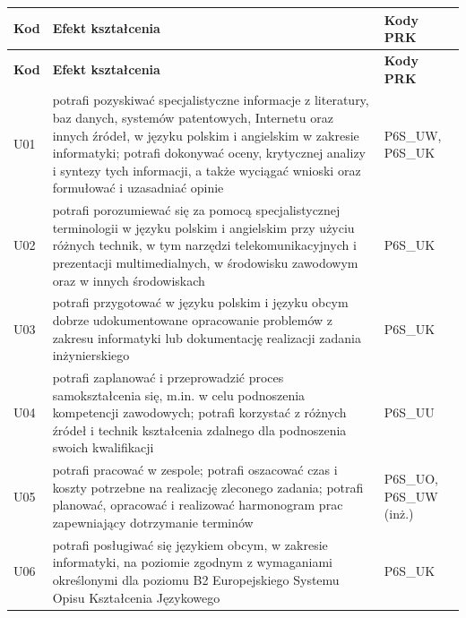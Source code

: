 \documentclass[12pt,a4paper]{article}
\newcommand{\thdrule}{\noalign{\global\setlength{\extrarowheight}{0pt}}}
\newcommand{\thdend}{\noalign{\global\setlength{\extrarowheight}{4pt}}}
\begin{document}
{\scriptsize
\begin{longtable}{m{1cm}m{9.5cm}m{3.9cm}}
\thdrule\toprule
\rowcolor{pjatkRed} {\color{white}\footnotesize\textbf{\vphantom{Ag}Kod}} & {\color{white}\footnotesize\textbf{\vphantom{Ag}Efekt kształcenia}} & {\color{white}\footnotesize\textbf{\vphantom{Ag}Kody PRK}} \\
\midrule\thdend
\endfirsthead
\thdrule\toprule
\rowcolor{pjatkRed} {\color{white}\footnotesize\textbf{\vphantom{Ag}Kod}} & {\color{white}\footnotesize\textbf{\vphantom{Ag}Efekt kształcenia}} & {\color{white}\footnotesize\textbf{\vphantom{Ag}Kody PRK}} \\
\midrule\thdend
\endhead
\rowcolor{tableRowLight} U01 & potrafi pozyskiwać specjalistyczne informacje z literatury, baz danych, systemów patentowych, Internetu oraz innych źródeł, w języku polskim i angielskim w zakresie informatyki; potrafi dokonywać oceny, krytycznej analizy i syntezy tych informacji,  a także wyciągać wnioski oraz formułować i uzasadniać opinie & {\scriptsize P6S\_UW, P6S\_UK} \\
\rowcolor{tableRowAlt} U02 & potrafi porozumiewać się za pomocą specjalistycznej terminologii w języku polskim i angielskim przy użyciu różnych technik, w tym narzędzi telekomunikacyjnych i prezentacji multimedialnych, w środowisku zawodowym oraz w innych środowiskach & {\scriptsize P6S\_UK} \\
\rowcolor{tableRowLight} U03 & potrafi przygotować w języku polskim i języku obcym dobrze udokumentowane opracowanie problemów z zakresu informatyki lub dokumentację realizacji zadania inżynierskiego & {\scriptsize P6S\_UK} \\
\rowcolor{tableRowAlt} U04 & potrafi zaplanować i przeprowadzić proces samokształcenia się, m.in. w celu podnoszenia kompetencji zawodowych; potrafi korzystać z różnych źródeł i technik kształcenia zdalnego dla podnoszenia swoich kwalifikacji & {\scriptsize P6S\_UU} \\
\rowcolor{tableRowLight} U05 & potrafi pracować w zespole; potrafi oszacować czas i koszty potrzebne na realizację zleconego zadania; potrafi planować, opracować i realizować harmonogram prac zapewniający dotrzymanie terminów & {\scriptsize P6S\_UO, P6S\_UW {\scriptsize (inż.)}} \\
\rowcolor{tableRowAlt} U06 & potrafi posługiwać się językiem obcym, w zakresie informatyki, na poziomie zgodnym z wymaganiami określonymi dla poziomu B2 Europejskiego Systemu Opisu Kształcenia Językowego & {\scriptsize P6S\_UK} \\

\end{longtable}}
\end{document}
